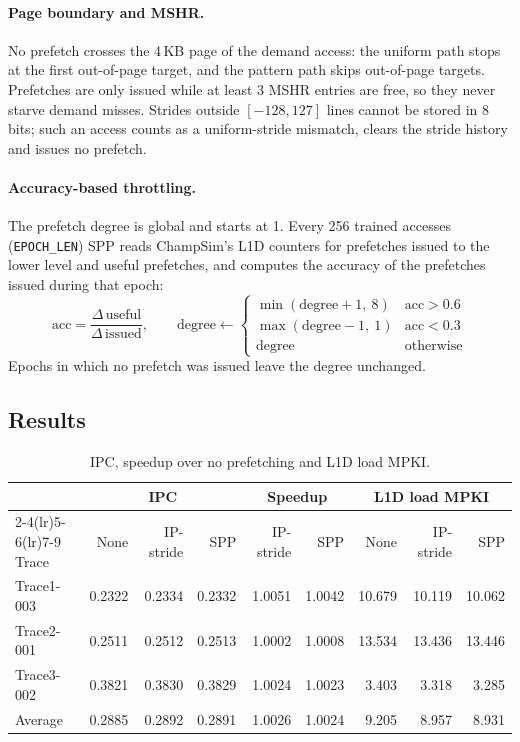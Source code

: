 \documentclass[11pt]{article}
\begin{document}
\paragraph{Page boundary and MSHR.}
No prefetch crosses the 4\,KB page of the demand access: the uniform path stops
at the first out-of-page target, and the pattern path skips out-of-page targets.
Prefetches are only issued while at least 3 MSHR entries are free, so they never
starve demand misses. Strides outside $[-128, 127]$ lines cannot be stored in
8 bits; such an access counts as a uniform-stride mismatch, clears the stride
history and issues no prefetch.

\paragraph{Accuracy-based throttling.}
The prefetch degree is global and starts at 1. Every 256 trained accesses
(\texttt{EPOCH\_LEN}) SPP reads ChampSim's L1D counters for prefetches issued to
the lower level and useful prefetches, and computes the accuracy of the
prefetches issued during that epoch:
\[
  \text{acc} = \frac{\Delta\,\text{useful}}{\Delta\,\text{issued}}, \qquad
  \text{degree} \leftarrow
  \begin{cases}
    \min(\text{degree} + 1,\ 8) & \text{acc} > 0.6\\
    \max(\text{degree} - 1,\ 1) & \text{acc} < 0.3\\
    \text{degree} & \text{otherwise}
  \end{cases}
\]
Epochs in which no prefetch was issued leave the degree unchanged.

\subsection{Results}

\begin{table}[H]
\centering
\begin{tabular}{lrrr rr rrr}
\toprule
& \multicolumn{3}{c}{IPC} & \multicolumn{2}{c}{Speedup} & \multicolumn{3}{c}{L1D load MPKI}\\
\cmidrule(lr){2-4}\cmidrule(lr){5-6}\cmidrule(lr){7-9}
Trace & None & IP-stride & SPP & IP-stride & SPP & None & IP-stride & SPP\\
\midrule
Trace1-003 & 0.2322 & 0.2334 & 0.2332 & 1.0051 & 1.0042 & 10.679 & 10.119 & 10.062\\
Trace2-001 & 0.2511 & 0.2512 & 0.2513 & 1.0002 & 1.0008 & 13.534 & 13.436 & 13.446\\
Trace3-002 & 0.3821 & 0.3830 & 0.3829 & 1.0024 & 1.0023 &  3.403 &  3.318 &  3.285\\
\midrule
Average    & 0.2885 & 0.2892 & 0.2891 & 1.0026 & 1.0024 &  9.205 &  8.957 &  8.931\\
\bottomrule
\end{tabular}
\caption{IPC, speedup over no prefetching and L1D load MPKI.}
\label{tab:t1-perf}
\end{table}
\end{document}
